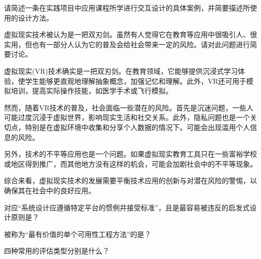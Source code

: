 \begin{problem}[2023]
请简述一条在实践项目中应用课程所学进行交互设计的具体案例，并简要描述所使用的设计方法。
\end{problem}




\begin{problem}[2023]
虚拟现实技术被认为是一把双刃剑。虽然有人觉得它在教育等应用中很吸引人、很实用，但也有一部分人认为它的普及会给社会带来一定的风险。请对此问题进行简要讨论。
\end{problem}

\begin{solution}
虚拟现实(VR)技术确实是一把双刃剑。在教育领域，它能够提供沉浸式学习体验，使学生能够更直观地理解抽象概念，加强记忆和理解。此外，VR还可用于模拟培训，提高实际操作技能，如医学手术或飞行模拟。

然而，随着VR技术的普及，社会面临一些潜在的风险。首先是沉迷问题，一些人可能过度沉浸于虚拟世界，影响现实生活和社交关系。此外，隐私问题也是一个关切点，特别是在虚拟环境中收集和分享个人数据的情况下。可能会出现滥用个人信息的风险。
    
另外，技术的不平等应用也是一个问题。如果虚拟现实教育工具只在一些富裕学校或地区得到推广，而其他地方没有这样的机会，可能会加剧社会中的不平等现象。
    
综合来看，虚拟现实技术的发展需要平衡技术应用的创新与对潜在风险的警惕，以确保其在社会中的良好应用。
\end{solution}



\begin{problem}[2023]
对应“系统设计应遵循特定平台的惯例并接受标准”，且是最容易被违反的启发式设计原则是？{\kaishu {}}
\end{problem}



\begin{problem}[2023]
被称为“最有价值的单个可用性工程方法”的是？{\kaishu {}}
\end{problem}



\begin{problem}[2023]
四种常用的评估类型分别是什么？
\end{problem}

